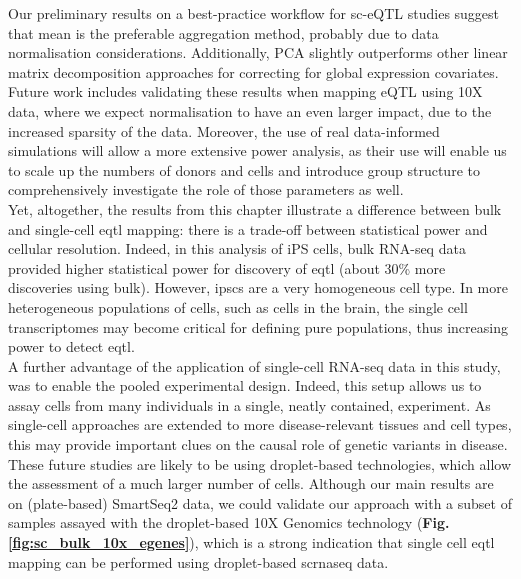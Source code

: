 Our preliminary results on a best-practice workflow for sc-eQTL studies suggest that mean is the preferable aggregation method, probably due to data normalisation considerations.
Additionally, PCA slightly outperforms other linear matrix decomposition approaches for correcting for global expression covariates.
Future work includes validating these results when mapping eQTL using 10X data, where we expect normalisation to have an even larger impact, due to the increased sparsity of the data.
Moreover, the use of real data-informed simulations will allow a more extensive power analysis, as their use will enable us to scale up the numbers of donors and cells and introduce group structure to comprehensively investigate the role of those parameters as well.
\\

Yet, altogether, the results from this chapter illustrate a difference between bulk and single-cell \gls{eqtl} mapping: there is a trade-off between statistical power and cellular resolution. 
Indeed, in this analysis of iPS cells, bulk RNA-seq data provided higher statistical power for discovery of \gls{eqtl} (about 30\% more discoveries using bulk). 
However, \glspl{ipsc} are a very homogeneous cell type.
In more heterogeneous populations of cells, such as cells in the brain, the single cell transcriptomes may become critical for defining pure populations, thus increasing power to detect \gls{eqtl}.\\

A further advantage of the application of single-cell RNA-seq data in this study, was to enable the pooled experimental design. 
Indeed, this setup allows us to assay cells from many individuals in a single, neatly contained, experiment.
As single-cell approaches are extended to more disease-relevant tissues and cell types, this may provide important clues on the causal role of genetic variants in disease. \\

These future studies are likely to be using droplet-based technologies, which allow the assessment of a much larger number of cells.
Although our main results are on (plate-based) SmartSeq2 data, we could validate our approach with a subset of samples assayed with the droplet-based 10X Genomics technology (\textbf{Fig. \ref{fig:sc_bulk_10x_egenes}}), which is a strong indication that single cell \gls{eqtl} mapping can be performed using droplet-based \gls{scrnaseq} data. \\

